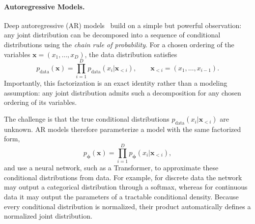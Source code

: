 




\paragraph{Autoregressive Models.}
Deep autoregressive (AR) models~\citep{frey1995does,larochelle2011neural,uria2016neural}
build on a simple but powerful observation: any joint distribution can be decomposed into a sequence of conditional distributions using the \emph{chain rule of probability}. 
For a chosen ordering of the variables $\mathbf{x}=(x_1,\ldots,x_D)$, the data distribution satisfies
\begin{equation*}
    p_{\mathrm{data}}(\mathbf{x})
    =
    \prod_{i=1}^{D}
    p_{\mathrm{data}}(x_i | \mathbf{x}_{<i}),
    \qquad
    \mathbf{x}_{<i}=(x_1,\ldots,x_{i-1}).
\end{equation*}
Importantly, this factorization is an exact identity rather than a modeling assumption: any joint distribution admits such a decomposition for any chosen ordering of its variables.

The challenge is that the true conditional distributions
$p_{\mathrm{data}}(x_i|\mathbf{x}_{<i})$ are unknown.
AR models therefore parameterize a model with the same factorized form,
\begin{equation*}
    p_{\bm{\phi}}(\mathbf{x})
    =
    \prod_{i=1}^{D}
    p_{\bm{\phi}}(x_i|\mathbf{x}_{<i}),
\end{equation*}
and use a neural network, such as a Transformer, to approximate these conditional distributions from data.
For example, for discrete data the network may output a categorical distribution through a softmax, whereas for continuous data it may output the parameters of a tractable conditional density.
Because every conditional distribution is normalized, their product automatically defines a normalized joint distribution.

